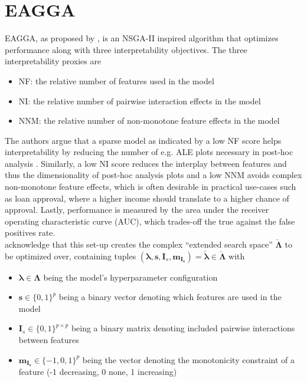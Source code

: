 \documentclass[twoside,11pt]{article}
\begin{document}
\section{EAGGA}
\label{sec-eagga}
EAGGA, as proposed by \citet{EAGGA}, is an NSGA-II inspired algorithm that optimizes performance along with three interpretability objectives.
The three interpretability proxies are
\begin{itemize}
  \item NF: the relative number of features used in the model
  \item NI: the relative number of pairwise interaction effects in the model
  \item NNM: the relative number of non-monotone feature effects in the model
\end{itemize}
The authors argue that a sparse model as indicated by a low NF score helps interpretability by reducing the number of e.g. ALE plots necessary in post-hoc
analysis \citep[p. 540]{EAGGA}. Similarly, a low NI score reduces the interplay between features and thus the dimensionality of post-hoc analysis plots
and a low NNM avoids complex non-monotone feature effects, which is often desirable in practical use-cases such as loan approval, where a higher income should
translate to a higher chance of approval.
Lastly, performance is measured by the area under the receiver operating characteristic curve (AUC), which trades-off the true against the false positives rate.
\\
\citet[pp. 540f]{EAGGA} acknowledge that this set-up creates the complex ``extended search space'' $\check{\boldsymbol\Lambda}$ to be optimized over, containing
tuples $(\boldsymbol\lambda, \boldsymbol{s}, \boldsymbol{I}_s, \boldsymbol{m}_{\boldsymbol{I}_{\boldsymbol{s}}})=\check{\boldsymbol\lambda}\in\check{\boldsymbol\Lambda}$
with
\begin{itemize}
  \item $\boldsymbol\lambda\in\boldsymbol\Lambda$ being the model's hyperparameter configuration
  \item $\boldsymbol{s}\in\{0,1\}^p$ being a binary vector denoting which features are used in the model
  \item $\boldsymbol{I}_s\in\{0,1\}^{p\times p}$ being a binary matrix denoting included pairwise interactions between features
  \item $\boldsymbol{m}_{\boldsymbol{I}_{\boldsymbol{s}}}\in\{-1,0,1\}^p$ being the vector denoting the monotonicity constraint of a feature (-1 decreasing, 0 none, 1 increasing)
\end{itemize}
\end{document}
